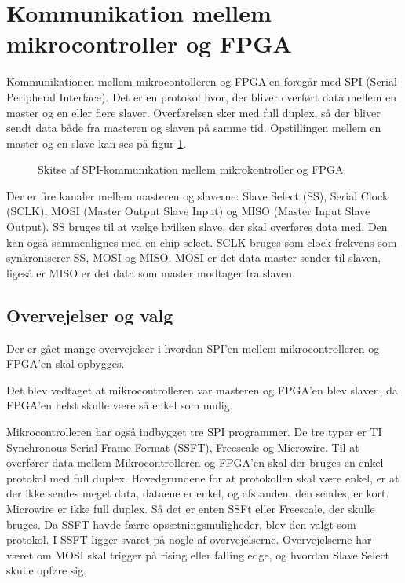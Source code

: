 \section{Kommunikation mellem mikrocontroller og FPGA}



Kommunikationen mellem mikrocontolleren og FPGA’en foregår med SPI (Serial Peripheral Interface). Det er en protokol hvor, der bliver overført data mellem en master og en eller flere slaver. Overførelsen sker med full duplex, så der bliver sendt data både fra masteren og slaven på samme tid. Opstillingen mellem en master og en slave kan ses på figur \ref{fig:SPImasterslave}.
\begin{figure}[!th]
\centering
\begin{tikzpicture}[scale=0.8]

\end{tikzpicture}
\caption[SPI protokol]{Skitse af SPI-kommunikation mellem mikrokontroller og FPGA.}
\label{fig:SPImasterslave}
\end{figure}

Der er fire kanaler mellem masteren og slaverne: Slave Select (SS), Serial Clock (SCLK), MOSI (Master Output Slave Input) og MISO (Master Input Slave Output). SS bruges til at vælge hvilken slave, der skal overføres data med. Den kan også sammenlignes med en chip select. SCLK bruges som clock frekvens som synkroniserer SS, MOSI og MISO. MOSI er det data master sender til slaven, ligeså er MISO er det data som master modtager fra slaven.
 

\subsection{Overvejelser og valg}
Der er gået mange overvejelser i hvordan SPI'en mellem mikrocontrolleren og FPGA'en skal opbygges.

Det blev vedtaget at mikrocontrolleren var masteren og FPGA'en blev slaven, da FPGA'en helst skulle være så enkel som mulig.

Mikrocontrolleren har også indbygget tre SPI programmer. De tre typer er TI Synchronous Serial Frame Format (SSFT), Freescale og Microwire. Til at overfører data mellem Mikrocontrolleren og FPGA’en skal der bruges en enkel protokol med full duplex. Hovedgrundene for at protokollen skal være enkel, er at der ikke sendes meget data, dataene er enkel, og afstanden, den sendes, er kort. Microwire er ikke full duplex. Så det er enten SSFt eller Freescale, der skulle bruges. Da SSFT havde færre opsætningsmuligheder, blev den valgt som protokol. I SSFT ligger svaret på nogle af overvejelserne. Overvejelserne har været om MOSI skal trigger på rising eller falling edge, og hvordan Slave Select skulle opføre sig.

